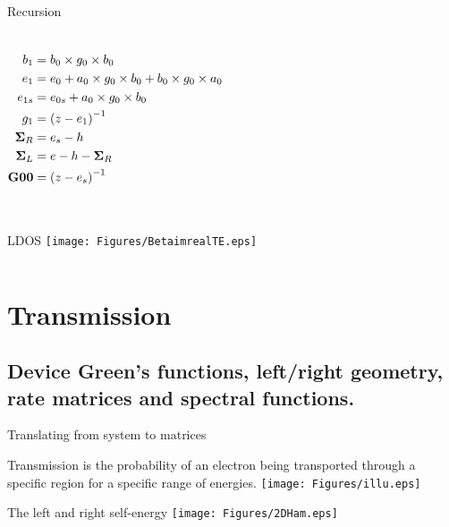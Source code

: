 \documentclass[hyperref={colorlinks=true,urlcolor=blue,linkcolor=.},aspectratio=1610,mathserif]{beamer}
\newcommand{\im}[3]{\inputminted[linenos=true, python3=true, firstline=#2, lastline=#3]{python}{#1}}
\begin{document}
\begin{frame}{Recursion}
\begin{overprint}
\begin{center}
\begin{columns}[c]
\begin{align*}
					b_1           & = b_0 \times g_0 \times b_0                                   \\
					e_1           & = e_0 + a_0 \times g_0 \times b_0 + b_0 \times g_0 \times a_0 \\
					e_{1s}        & = e_{0s} + a_0 \times g_0 \times b_0                          \\
					g_1           & = \pqty{z-e_1}^{-1}                                           \\
					\vb{\Sigma}_R & = e_s - h                                                     \\
					\vb{\Sigma}_L & = e - h - \vb{\Sigma}_R                                       \\
					\vb{G00}      & = \pqty{z-e_s}^{-1}
				\end{align*}
			\end{columns}
		\end{center}
		\im{Listings/Functions.py}{92}{109}
	\end{overprint}
\end{frame}

\begin{frame}{LDOS}
	\centering
	\texttt{[image: Figures/BetaimrealTE.eps]}
	\im{Listings/SelfEnergyByRecursion.py}{64}{68}
\end{frame}

\section{Transmission}
\subsection{Device Green's functions, left/right geometry, rate matrices and spectral functions.}

\begin{frame}{Translating from system to matrices}
\centering
\begin{overprint}
		    Transmission is the probability of an electron being transported through a specific region for a specific range of energies.
			\texttt{[image: Figures/illu.eps]}
\end{overprint}
\end{frame}

\begin{frame}{The left and right self-energy}
    \centering
   \texttt{[image: Figures/2DHam.eps]}
    \im{Listings/Functions.py}{210}{212}
\end{frame}
\end{document}

